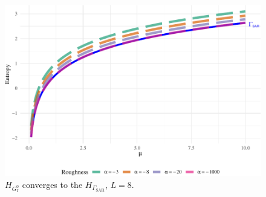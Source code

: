\documentclass[aspectratio=169,10pt]{beamer}
\begin{document}
\begin{frame}
\begin{columns}[T,onlytextwidth]
    
\begin{column}{.48\textwidth}\vspace{-0.5cm}
		     \begin{block}{} 
		\justifying
				\begin{figure}[H] 
         \centering
         \includegraphics[scale=0.45]{./Figures/Plot_GI0_to_gamma1-1} 
        \caption*{$H_{ G_I^0}$ converges to the $H_{\Gamma_{\text{SAR}}}$, $L=8$.}
    \end{figure}
\end{block}\vspace{2.8cm}
    \end{column}
\end{columns}\vspace{0.2cm}
       

\end{frame} 
\end{document}
